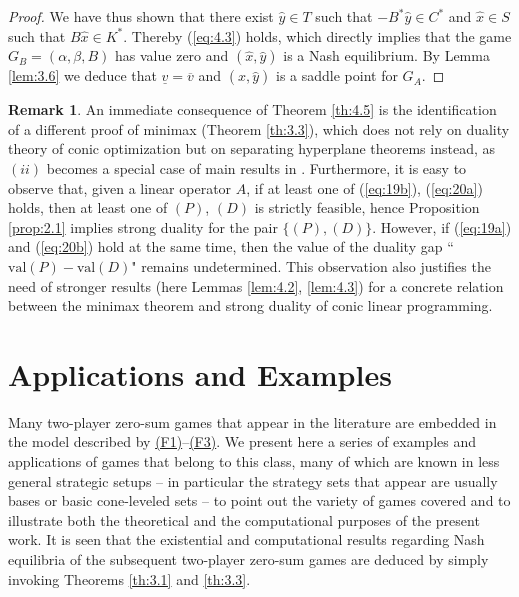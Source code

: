 \documentclass[11pt, twoside]{article}
\numberwithin{equation}{section}
\theoremstyle{definition}
\newtheorem{remark}{Remark}[section]
\begin{document}
\begin{proof}
    We have thus shown that there exist $\hat{y}\in T$ such that $-B^*\hat{y}\in C^*$ and $\hat{x}\in S$ such that $B\hat{x}\in K^*$. Thereby (\ref{eq:4.3}) holds, which directly implies that the game $G_B= (\alpha,\beta,B)$ has value zero and $(\hat{x},\hat{y})$ is a Nash equilibrium. By Lemma  \ref{lem:3.6} we deduce that $\underline{v}=\overline{v}$ and $(\hat{x},\hat{y})$ is a saddle point for $G_A$.
\end{proof}

\begin{remark} An immediate consequence of Theorem \ref{th:4.5} is the identification of a different proof of minimax (Theorem \ref{th:3.3}), which does not rely on duality theory of conic optimization but on separating hyperplane theorems instead, as $(ii)$ becomes a special case of main results in
\cite{doi:10.1080/02331938908843428, yang2000theorems}. Furthermore, it is easy to observe that, given a linear operator $A$, if at least one of (\ref{eq:19b}), (\ref{eq:20a}) holds, then at least one of \hyperlink{primal}{$(P)$}, \hyperlink{dual}{$(D)$} is strictly feasible, hence Proposition \ref{prop:2.1} implies strong duality for the pair \hyperlink{primaldual}{$\{(P),(D)\}$}. However, if (\ref{eq:19a}) and (\ref{eq:20b}) hold at the same time, then the value of the duality gap ``$\text{val}(P)-\text{val}(D)$" remains undetermined. This observation also justifies the need of stronger results (here Lemmas \ref{lem:4.2}, \ref{lem:4.3}) for a concrete relation between the minimax theorem and strong duality of conic linear programming.
\end{remark}

\vspace{-0.1cm}\section{Applications and Examples}\label{sec:5}\vspace{-0.2cm}

Many two-player zero-sum games that appear in the literature are embedded in the model described by \hyperlink{f1}{(F1)}--\hyperlink{f3}{(F3)}. We present here a series of examples and applications of games that belong to this class, many of which are known in less general strategic setups -- in particular the strategy sets that appear are usually bases or basic cone-leveled sets -- to point out the variety of games covered and to illustrate both the theoretical and the computational purposes of the present work. It is seen that the existential and computational results regarding Nash equilibria of the subsequent two-player zero-sum games are deduced by simply invoking Theorems \ref{th:3.1} and \ref{th:3.3}.
\end{document}
